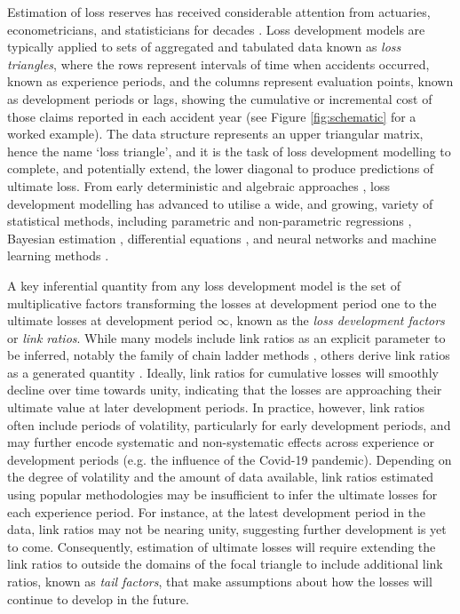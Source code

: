 Estimation of loss reserves 
has received considerable attention from actuaries, econometricians,
and statisticians for decades 
\citep[e.g. for some key developments, see][]{bornhuetter1972,clarke1974,
taylor1977,taylor1983,mack1993,barnett2000,englandverrall2001,englandverrall2002,
taylor2003,wuthrich2008}. 
Loss development models are typically applied to sets of aggregated and tabulated
data known as \textit{loss triangles}, where the rows represent
intervals of time when accidents occurred, known as experience periods,
and the columns represent evaluation points, known as development periods or lags,
showing the cumulative or incremental cost of those claims reported in each accident year
(see Figure \ref{fig:schematic} for a worked example).
The data structure represents an upper triangular matrix, hence
the name `loss triangle', and it is the task of loss development modelling 
to complete, and potentially extend, the
lower diagonal to produce predictions of ultimate loss.
From early deterministic and 
algebraic approaches \citep[e.g.][]{scurfield1968,
bornhuetter1972,clarke1974,taylor1977}, loss development modelling has
advanced to utilise a wide, and growing, variety of statistical methods, 
including parametric and non-parametric regressions \citep{mack1994,englandverrall2001,
englandverrall2002,lally2018}, Bayesian estimation \citep{englandverrall2002,dealba2002,
zhang2012,meyers2015}, differential equations \citep{gesmann2020}, and 
neural networks and machine learning methods 
\citep{kunce2017,kuo2019,almudafer2022}.

A key inferential quantity from any loss development
model is the set of multiplicative factors transforming 
the losses at development period one to
the ultimate losses at development period $\infty$,
known as the \textit{loss development factors} or \textit{link ratios}. 
While many models include link ratios as an explicit parameter to be 
inferred, notably the family of chain ladder methods
\citep[e.g.][]{mack1993,englandverrall2002},
others derive link ratios as a generated quantity \citep{englandverrall2001,meyers2015}. 
Ideally, link ratios for cumulative losses will smoothly decline over time towards unity,
indicating that the losses are approaching their ultimate value at later development
periods.
In practice, however, link ratios often include periods of volatility, particularly
for early development periods, and may further encode systematic
and non-systematic effects across experience or 
development periods (e.g. the influence of the Covid-19 pandemic).
Depending on the degree of volatility and the amount of data available,
link ratios estimated using popular methodologies
may be insufficient to infer the ultimate losses for each experience period.
For instance, at the latest development period in the data, link ratios
may not be nearing unity, suggesting further development is yet to come.
Consequently, estimation of ultimate losses will require extending the link ratios
to outside the domains of the focal triangle to include additional
link ratios, known as \textit{tail factors}, that make assumptions
about how the losses will continue to develop in the future.

